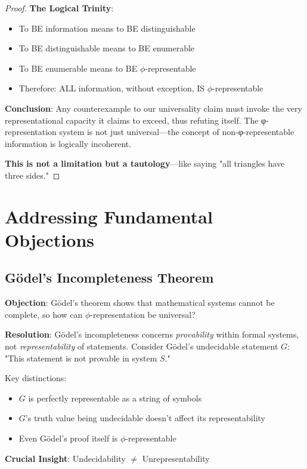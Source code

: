 \documentclass[12pt,letterpaper]{article}
\begin{document}
\begin{proof}
\textbf{The Logical Trinity}:
\begin{itemize}
\item To BE information means to BE distinguishable
\item To BE distinguishable means to BE enumerable  
\item To BE enumerable means to BE $\phi$-representable
\item Therefore: ALL information, without exception, IS $\phi$-representable
\end{itemize}

\textbf{Conclusion}: Any counterexample to our universality claim must invoke the very representational capacity it claims to exceed, thus refuting itself. The φ-representation system is not just universal—the concept of non-φ-representable information is logically incoherent.

\textbf{This is not a limitation but a tautology}—like saying "all triangles have three sides."
\end{proof}

\section{Addressing Fundamental Objections}

\subsection{Gödel's Incompleteness Theorem}

\textbf{Objection}: Gödel's theorem shows that mathematical systems cannot be complete, so how can $\phi$-representation be universal?

\textbf{Resolution}: Gödel's incompleteness concerns \textit{provability} within formal systems, not \textit{representability} of statements. Consider Gödel's undecidable statement $G$: "This statement is not provable in system $S$."

Key distinctions:
\begin{itemize}
\item $G$ is perfectly representable as a string of symbols
\item $G$'s truth value being undecidable doesn't affect its representability  
\item Even Gödel's proof itself is $\phi$-representable
\end{itemize}

\textbf{Crucial Insight}: Undecidability $\neq$ Unrepresentability
\end{document}
